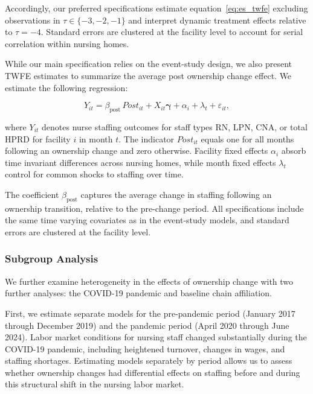 \documentclass[12pt]{article}
\begin{document}
Accordingly, our preferred specifications estimate equation~\eqref{eq:es_twfe} excluding observations in $\tau\in\{-3,-2,-1\}$ and interpret dynamic treatment effects relative to $\tau=-4$. Standard errors are clustered at the facility level to account for serial correlation within nursing homes.

While our main specification relies on the event-study design, we also present TWFE estimates to summarize the average post ownership change effect. We estimate the following regression:

\begin{equation}
  Y_{it}
  =
  \beta_{\text{post}}\,\textit{Post}_{it}
  +
  X_{it}\boldsymbol{\gamma}
  +
  \alpha_i
  +
  \lambda_t
  +
  \varepsilon_{it},
  \label{eq:twfe-post}
\end{equation}

where $Y_{it}$ denotes nurse staffing outcomes for staff types RN, LPN, CNA, or total HPRD for facility $i$ in month $t$. The indicator $\textit{Post}_{it}$ equals one for all months following an ownership change and zero otherwise. Facility fixed effects $\alpha_i$ absorb time invariant differences across nursing homes, while month fixed effects $\lambda_t$ control for common shocks to staffing over time.

The coefficient $\beta_{\text{post}}$ captures the average change in staffing following an ownership transition, relative to the pre-change period. All specifications include the same time varying covariates as in the event-study models, and standard errors are clustered at the facility level.

\subsubsection{Subgroup Analysis}

We further examine heterogeneity in the effects of ownership change with two further analyses: the COVID-19 pandemic and baseline chain affiliation.

First, we estimate separate models for the pre-pandemic period (January 2017 through December 2019) and the pandemic period (April 2020 through June 2024). Labor market conditions for nursing staff changed substantially during the COVID-19 pandemic, including heightened turnover, changes in wages, and staffing shortages. Estimating models separately by period allows us to assess whether ownership changes had differential effects on staffing before and during this structural shift in the nursing labor market.
\end{document}
